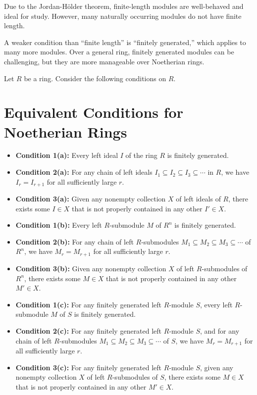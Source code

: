 \documentclass[lang=cn,11pt]{template}
\begin{document}
Due to the Jordan-Hölder theorem, finite-length modules are well-behaved and ideal for study. However, many naturally occurring modules do not have finite length.

A weaker condition than “finite length” is “finitely generated,” which applies to many more modules. Over a general ring, finitely generated modules can be challenging, but they are more manageable over Noetherian rings.

Let \( R \) be a ring. Consider the following conditions on \( R \).

\section{Equivalent Conditions for Noetherian Rings}

\begin{itemize}
    \item \textbf{Condition 1(a):} Every left ideal \( I \) of the ring \( R \) is finitely generated.
    \item \textbf{Condition 2(a):} For any chain of left ideals \( I_1 \subseteq I_2 \subseteq I_3 \subseteq \cdots \) in \( R \), we have \( I_r = I_{r+1} \) for all sufficiently large \( r \).
    \item \textbf{Condition 3(a):} Given any nonempty collection \( X \) of left ideals of \( R \), there exists some \( I \in X \) that is not properly contained in any other \( I' \in X \).
    
    \item \textbf{Condition 1(b):} Every left \( R \)-submodule \( M \) of \( R^n \) is finitely generated.
    \item \textbf{Condition 2(b):} For any chain of left \( R \)-submodules \( M_1 \subseteq M_2 \subseteq M_3 \subseteq \cdots \) of \( R^n \), we have \( M_r = M_{r+1} \) for all sufficiently large \( r \).
    \item \textbf{Condition 3(b):} Given any nonempty collection \( X \) of left \( R \)-submodules of \( R^n \), there exists some \( M \in X \) that is not properly contained in any other \( M' \in X \).

    \item \textbf{Condition 1(c):} For any finitely generated left \( R \)-module \( S \), every left \( R \)-submodule \( M \) of \( S \) is finitely generated.
    \item \textbf{Condition 2(c):} For any finitely generated left \( R \)-module \( S \), and for any chain of left \( R \)-submodules \( M_1 \subseteq M_2 \subseteq M_3 \subseteq \cdots \) of \( S \), we have \( M_r = M_{r+1} \) for all sufficiently large \( r \).
    \item \textbf{Condition 3(c):} For any finitely generated left \( R \)-module \( S \), given any nonempty collection \( X \) of left \( R \)-submodules of \( S \), there exists some \( M \in X \) that is not properly contained in any other \( M' \in X \).
\end{itemize}
\end{document}
